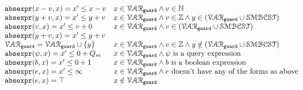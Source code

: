   \[
    \begin{array}{ll} 
      \mathtt{abs}{\mathtt{expr}}(x - v, x)  = x' \leq x - v  & x \in \mathcal{VAR}_{\mathtt{guard}} \land v \in \mathbb{N} \\
      \mathtt{abs}{\mathtt{expr}}(y + v, x)  = x' \leq y + v  & x \in \mathcal{VAR}_{\mathtt{guard}} \land v \in \mathbb{Z} \land y \in (\mathcal{VAR}_{\mathtt{guard}} \cup \mathcal{SMBCST}) \\
      \mathtt{abs}{\mathtt{expr}}(v, x)  = x' \leq v + 0  & x \in \mathcal{VAR}_{\mathtt{guard}} \land v \in (\mathcal{VAR}_{\mathtt{guard}} \cup \mathcal{SMBCST}) \\
      \mathtt{abs}{\mathtt{expr}}(y + v, x)  = x' \leq y + v & \\
      \mathcal{VAR}_{\mathtt{guard}} = \mathcal{VAR}_{\mathtt{guard}} \cup \{y\} & x \in \mathcal{VAR}_{\mathtt{guard}} \land v \in \mathbb{Z} \land y \notin (\mathcal{VAR}_{\mathtt{guard}} \cup \mathcal{SMBCST})  \\
      \mathtt{abs}{\mathtt{expr}}(\psi, x)  = x' \leq 0 + Q_m & x \in \mathcal{VAR}_{\mathtt{guard}} \land \psi \text{ is a query expression}  \\
      \mathtt{abs}{\mathtt{expr}}(b, x) = x' \leq 0 + 1   & x \in \mathcal{VAR}_{\mathtt{guard}} \land b \text{ is a boolean expression} \\
      \mathtt{abs}{\mathtt{expr}}(e, x) = x' \leq \infty  &  x \in \mathcal{VAR}_{\mathtt{guard}} \land e \text{ doesn't have any of the forms as above} \\
      \mathtt{abs}{\mathtt{expr}}(e, x) = \top  &  x \notin \mathcal{VAR}_{\mathtt{guard}} \\
    \end{array}
    \]
  
